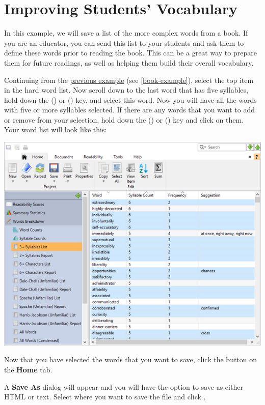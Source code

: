 \documentclass[
]{book}
\theoremstyle{definition}
\theoremstyle{definition}
\theoremstyle{definition}
\theoremstyle{definition}
\theoremstyle{remark}
\begin{document}
\newpage

\hypertarget{vocab-builder-example}{%
\section{Improving Students' Vocabulary}\label{vocab-builder-example}}

In this example, we will save a list of the more complex words from a book. If you are an educator, you can send this list to your students and ask them to define these words prior to reading the book. This can be a great way to prepare them for future readings, as well as helping them build their overall vocabulary.

Continuing from the \protect\hyperlink{book-example}{previous example} (see \ref{book-example}), select the top item in the hard word list. Now scroll down to the last word that has five syllables, hold down the  (\faWindows) or \keys{\shift} (\faApple) key, and select this word. Now you will have all the words with five or more syllables selected. If there are any words that you want to add or remove from your selection, hold down the  (\faWindows) or \keys{\cmd} (\faApple) key and click on them. Your word list will look like this:

\includegraphics{Images/difficultwords2.png}

Now that you have selected the words that you want to save, click the  button on the \textbf{Home} tab.

A \textbf{Save As} dialog will appear and you will have the option to save as either HTML or text. Select where you want to save the file and click .
\end{document}
